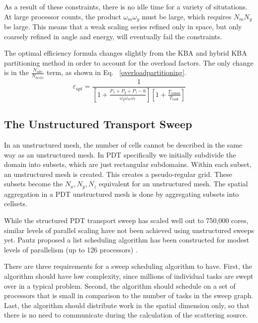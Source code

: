 \documentclass[11pt, letterpaper,titlepage,oneside]{article}
\begin{document}
As a result of these constraints, there is no idle time for a variety of situtations. At large processor counts, the product $\omega_m \omega_g$ must be large, which requires $N_m N_g$ be large. This means that a weak scaling series refined only in space, but only coarsely refined in angle and energy, will eventually fail the constraints.

The optimal efficiency formula changes slightly from the KBA and hybrid KBA partitioning method in order to account for the overload factors. The only change is in the $\frac{N_{idle}}{N_{tasks}}$ term, as shown in Eq. ~\eqref{overloadpartitioning}. 
\begin{equation}
\varepsilon_{opt} = \frac{1}{[1+\frac{P_x+P_y+P_z-6}{\omega_g \omega_m \omega_r}][1+\frac{T_{\text{comm}}}{T_{\text{task}}}]}
\label{overloadpartitioning}
\end{equation}


\subsection{The Unstructured Transport Sweep}
In an unstructured mesh, the number of cells cannot be described in the same way as an unstructured mesh. In PDT specifically we initially subdivide the domain into subsets, which are just rectangular subdomains. Within each subset, an unstructured mesh is created. This creates a pseudo-regular grid. These subsets become the $N_x, N_y, N_z$ equivalent for an unstructured mesh. The spatial aggregation in a PDT unstructured mesh is done by aggregating subsets into cellsets. 

While the structured PDT transport sweep has scaled well out to 750,000 cores, similar levels of parallel scaling have not been achieved using unstructured sweeps yet. Pautz proposed a list scheduling algorithm has been constructed for modest levels of parallelism (up to 126 processors)\cite{Pautz} .

There are three requirements for a sweep scheduling algorithm to have. First, the algorithm should have low complexity, since millions of individual tasks are swept over in a typical problem. Second, the algorithm should schedule on a set of processors that is small in comparison to the number of tasks in the sweep graph. Last, the algorithm should distribute work in the spatial dimension only, so that there is no need to communicate during the calculation of the scattering source. 
\end{document}
